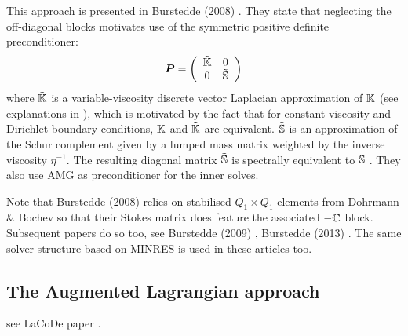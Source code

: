 This approach is presented in Burstedde \etal (2008) \cite{bugg08}.
They state that neglecting the off-diagonal blocks motivates use of the symmetric
positive definite preconditioner:
\[
{\bm P} = \left(
\begin{array}{cc}
\tilde{{\mathbb{K}}} & 0 \\
0 & \tilde{{\mathbb{S}}}
\end{array}
\right)
\]
where $\tilde{{\mathbb{K}}}$ is a variable-viscosity discrete vector Laplacian
approximation of ${\mathbb{K}}$ (see explanations in \cite{bugs09}), 
which is motivated by the fact that
for constant viscosity and Dirichlet boundary conditions,
${\mathbb{K}}$ and $\tilde{{\mathbb{K}}}$ are equivalent. 
$\tilde{{\mathbb{S}}}$ is an approximation of
the Schur complement given by a lumped mass matrix
weighted by the inverse viscosity $\eta^{-1}$. The resulting
diagonal matrix $\tilde{{\mathbb{S}}}$ is spectrally equivalent to ${\mathbb{S}}$ \cite{elsw}.
They also use AMG as preconditioner for the inner solves. 

Note that Burstedde \etal  (2008) \cite{bugg08} relies on stabilised 
$Q_1\times Q_1$ elements from Dohrmann \& Bochev \cite{dobo04} 
so that their Stokes matrix does feature the associated $-{\mathbb{C}}$ block.
Subsequent papers do so too, see Burstedde \etal (2009) \cite{bugs09}, 
Burstedde \etal (2013) \cite{busa13}.
The same solver structure based on MINRES is used in these articles too.

\subsection{The Augmented Lagrangian approach}

see LaCoDe paper \cite{demh19}.

